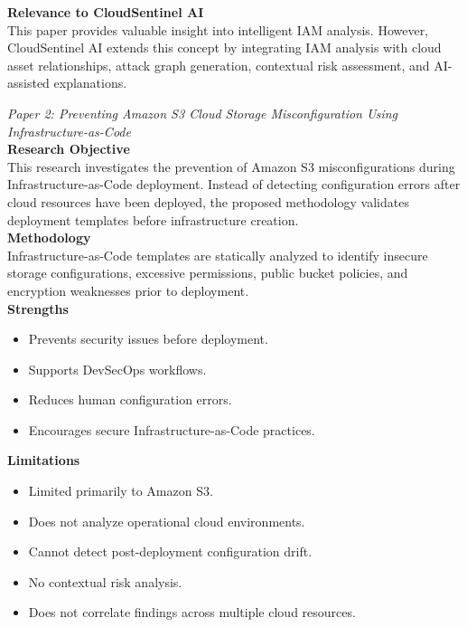 \textbf{Relevance to CloudSentinel AI}\\
This paper provides valuable insight into intelligent IAM analysis. However, CloudSentinel AI extends this concept by integrating IAM analysis with cloud asset relationships, attack graph generation, contextual risk assessment, and AI-assisted explanations.

\emph{Paper 2: Preventing Amazon S3 Cloud Storage Misconfiguration Using Infrastructure-as-Code}\\
\textbf{Research Objective}\\
This research investigates the prevention of Amazon S3 misconfigurations during Infrastructure-as-Code deployment. Instead of detecting configuration errors after cloud resources have been deployed, the proposed methodology validates deployment templates before infrastructure creation.\\
\textbf{Methodology}\\
Infrastructure-as-Code templates are statically analyzed to identify insecure storage configurations, excessive permissions, public bucket policies, and encryption weaknesses prior to deployment.\\
\textbf{Strengths}

\begin{itemize}
\tightlist
\item
  Prevents security issues before deployment.\\
\item
  Supports DevSecOps workflows.\\
\item
  Reduces human configuration errors.\\
\item
  Encourages secure Infrastructure-as-Code practices.
\end{itemize}

\textbf{Limitations}

\begin{itemize}
\tightlist
\item
  Limited primarily to Amazon S3.\\
\item
  Does not analyze operational cloud environments.\\
\item
  Cannot detect post-deployment configuration drift.\\
\item
  No contextual risk analysis.\\
\item
  Does not correlate findings across multiple cloud resources.
\end{itemize}

